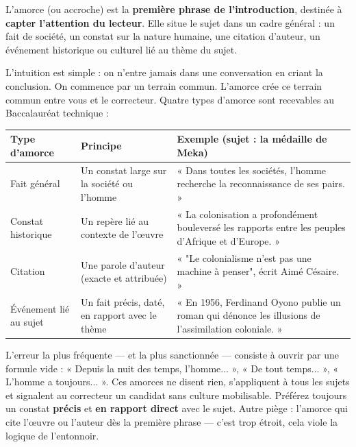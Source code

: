 \documentclass[11pt]{article}
\newcommand{\cle}[1]{{\popxbold\color{popdark}#1}}
\newcounter{popsec}
\newcounter{popsub}
\newcommand{\courssub}[1]{%
  \stepcounter{popsub}%
  \par\vspace{9pt}\noindent{\popxbold\fontsize{11.5}{13}\selectfont\color{popink}{\color{poporange}\thepopsec.\thepopsub}\hspace{6pt}#1}\par\nopagebreak\vspace{4pt}
}
\begin{document}
\courssub{Composante 1 : l'amorce (ou accroche)}

\begin{definition}[L'amorce]
L'\cle{amorce} (ou \cle{accroche}) est la \textbf{première phrase de l'introduction}, destinée à \textbf{capter l'attention du lecteur}. Elle situe le sujet dans un cadre général : un fait de société, un constat sur la nature humaine, une citation d'auteur, un événement historique ou culturel lié au thème du sujet.
\end{definition}

L'intuition est simple : on n'entre jamais dans une conversation en criant la conclusion. On commence par un terrain commun. L'amorce crée ce terrain commun entre vous et le correcteur. Quatre types d'amorce sont recevables au Baccalauréat technique :

\begin{center}
\begin{tabularx}{\linewidth}{|l|X|X|}
\hline
\rowcolor{popblueL} \textbf{Type d'amorce} & \textbf{Principe} & \textbf{Exemple (sujet : la médaille de Meka)} \\
\hline
Fait général & Un constat large sur la société ou l'homme & « Dans toutes les sociétés, l'homme recherche la reconnaissance de ses pairs. » \\
\hline
Constat historique & Un repère lié au contexte de l'œuvre & « La colonisation a profondément bouleversé les rapports entre les peuples d'Afrique et d'Europe. » \\
\hline
Citation & Une parole d'auteur (exacte et attribuée) & « "Le colonialisme n'est pas une machine à penser", écrit Aimé Césaire. » \\
\hline
Événement lié au sujet & Un fait précis, daté, en rapport avec le thème & « En 1956, Ferdinand Oyono publie un roman qui dénonce les illusions de l'assimilation coloniale. » \\
\hline
\end{tabularx}
\end{center}

\begin{attention}
L'erreur la plus fréquente — et la plus sanctionnée — consiste à ouvrir par une formule vide : « Depuis la nuit des temps, l'homme... », « De tout temps... », « L'homme a toujours... ». Ces amorces ne disent rien, s'appliquent à tous les sujets et signalent au correcteur un candidat sans culture mobilisable. Préférez toujours un constat \textbf{précis} et \textbf{en rapport direct} avec le sujet. Autre piège : l'amorce qui cite l'œuvre ou l'auteur dès la première phrase — c'est trop étroit, cela viole la logique de l'entonnoir.
\end{attention}
\end{document}
